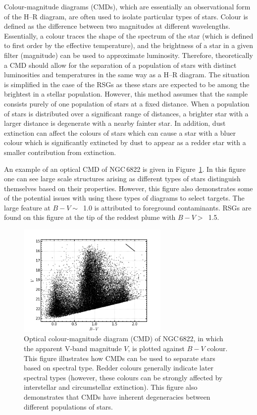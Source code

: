 Colour-magnitude diagrams (CMDs), which are essentially an observational form of the H--R diagram, are often used to isolate particular types of stars.
Colour is defined as the difference between two magnitudes at different wavelengths.
Essentially, a colour traces the shape of the spectrum of the star (which is defined to first order by the effective temperature), and the brightness of a star in a given filter (magnitude) can be used to approximate luminosity.
Therefore, theoretically a CMD should allow for the separation of a population of stars with distinct luminosities and temperatures in the same way as a H--R diagram.
The situation is simplified in the case of the RSGs as these stars are expected to be among the brightest in a stellar population.
However, this method assumes that the sample consists purely of one population of stars at a fixed distance.
When a population of stars is distributed over a significant range of distances, a brighter star with a larger distance is degenerate with a nearby fainter star.
In addition, dust extinction can affect the colours of stars which can cause a star with a bluer colour which is significantly extincted by dust to appear as a redder star with a smaller contribution from extinction.

An example of an optical CMD of NGC\,6822 is given in Figure~\ref{fig:CMD}.
In this figure one can see large scale structures arising as different types of stars distinguish themselves based on their properties.
However, this figure also demonstrates some of the potential issues with using these types of diagrams to select targets.
The large feature at $B-V \sim$~1.0 is attributed to foreground contaminants.
RSGs are found on this figure at the tip of the reddest plume with $B-V >$~1.5.

\begin{figure}
 \centering
 \includegraphics[width=0.65\textwidth]{intro/NGC6822_bv_CMD}
 \caption[Optical colour-magnitude diagram of NGC\,6822]{Optical colour-magnitude diagram (CMD) of NGC\,6822, in which the apparent V-band magnitude $V$, is plotted against $B-V$ colour.
This figure illustrates how CMDs can be used to separate stars based on spectral type. Redder colours generally indicate later spectral types (however, these colours can be strongly affected by interstellar and circumstellar extinction).
This figure also demonstrates that CMDs have inherent degeneracies between different populations of stars.
 \label{fig:CMD}}
\end{figure}

